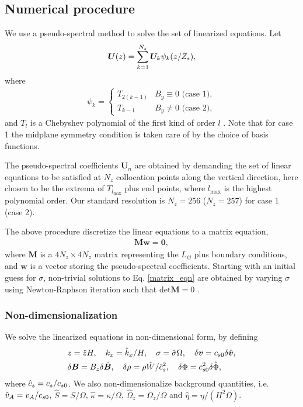 \subsection{Numerical procedure}
We use a pseudo-spectral method to solve the set of linearized
equations. Let
\begin{align}\label{cheby_expand}
  \bm{U}(z) 
  = \sum_{k=1}^{N_z} \bm{U}_k\psi_k(z/Z_s), 
\end{align}
where 
\begin{align}
  \psi_k  = 
  \begin{cases}
    T_{2(k-1)} & B_y \equiv 0 \text{ (case 1)},\\
    T_{k-1}   & B_y\neq 0 \text{ (case 2)},
  \end{cases}
\end{align}
and  $T_l$ is a Chebyshev polynomial of the first kind of order $l$
\citep{stegun65}. Note that for case 1 the midplane symmetry condition
is taken care of by the choice of basis functions. 

The pseudo-spectral coefficients $\bm{U}_n$  are obtained by demanding
the set of linear equations to be satisfied at $N_z$ collocation
points along the vertical direction, here chosen to be the 
extrema of $T_{l_\mathrm{max}}$ plus end points, where 
$l_\mathrm{max}$ is the highest polynomial order. Our standard
resolution is $N_z=256$ ($N_z=257$) for case 1 (case 2).   

The above procedure discretize the linear equations to a matrix equation,
\begin{align}\label{matrix_eqn}
\bm{M}\bm{w} = \mathbf{0}, 
\end{align}
where $\bm{M}$ is a $4N_z\times 4 N_z$ matrix representing the $L_{ij}$ 
plus boundary conditions, 
and $\bm{w}$ is a vector storing the pseudo-spectral coefficients. 
Starting with an initial guess for $\sigma$, non-trivial solutions to
Eq. \ref{matrix_eqn} are obtained by varying $\sigma$ using Newton-Raphson iteration 
such that $\mathrm{det}\bm{M}=0$ \citep[details can be found in][]{lin12}.


\subsubsection{Non-dimensionalization}\label{non-dim}
We solve the linearized equations in non-dimensional form,
by defining
\begin{align}
  &z=\hat{z}H,\quad k_x =  \hat{k}_x/H,\quad \sigma = \hat{\sigma}\Omega,
  \quad \delta\bm{v} = c_{s0} 
  \delta\hat{\bm{v}}, \\ 
  &\delta\bm{B} = B_z\delta\hat{\bm{B}},\quad
  \delta\rho = \rho\hat{W}/\hat{c}_s^2,\quad \delta\Phi =
  c_{s0}^2\delta\hat{\Phi},  
\end{align} 
where $\hat{c}_s=c_s/c_{s0}$. We also non-dimensionalize 
background quantities, i.e. $\hat{v}_A=v_A/c_{s0}$,
$\hat{S}=S/\Omega$, $\hat{\kappa}=\kappa/\Omega$,
$\hat{\Omega}_z=\Omega_z/\Omega$ and $\hat{\eta} = \eta/(H^2\Omega)$. 


